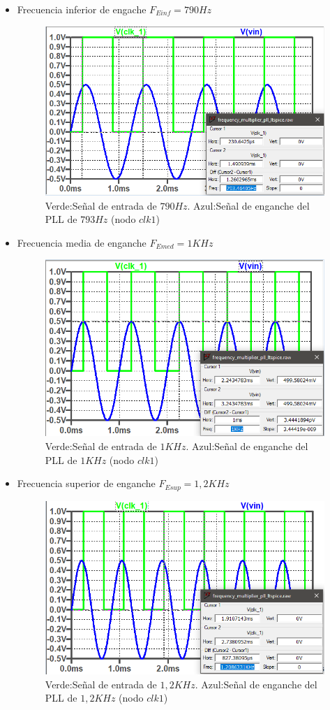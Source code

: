 \documentclass[10pt,a4paper]{IEEEtran}
\begin{document}
\begin{itemize}
    \item Frecuencia inferior de engache $F_{Einf} =790Hz$
    \begin{figure}[H]
        \centering
        \includegraphics[width=.45\textwidth]{Fig/Engancheinferior}
        \caption{Verde:Señal de entrada de $790Hz$. Azul:Señal de enganche del PLL de $793Hz$ (nodo $clk1$)}
        \label{Einf}
    \end{figure}
    \item Frecuencia media de enganche $F_{Emed}=1KHz$
    \begin{figure}[H]
        \centering
        \includegraphics[width=.45\textwidth]{Fig/EngancheMedio}
        \caption{Verde:Señal de entrada de $1KHz$. Azul:Señal de enganche del PLL de $1KHz$ (nodo $clk1$)}
        \label{Emed}
    \end{figure} 
    \item Frecuencia superior de enganche $F_{Esup}=1,2KHz$
    \begin{figure}[H]
        \centering
        \includegraphics[width=.45\textwidth]{Fig/EngancheSuperior}
        \caption{Verde:Señal de entrada de $1,2KHz$. Azul:Señal de enganche del PLL de $1,2KHz$ (nodo $clk1$)}
        \label{Esup}
    \end{figure}
\end{itemize}  
\end{document}
